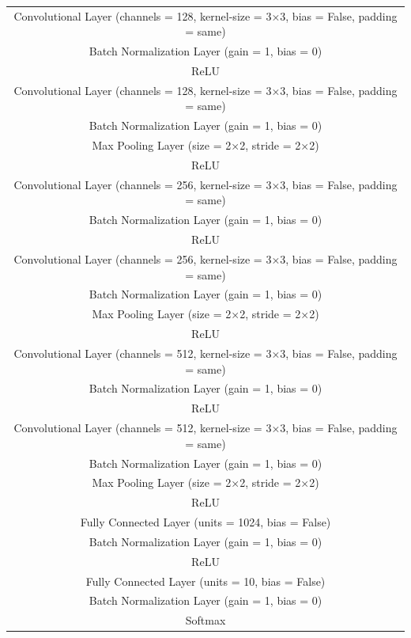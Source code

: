 \begin{table}[H]
\begin{center}
\begin{tabular}{  c  }
\hline
   Convolutional Layer (channels = 128, kernel-size = 3×3, bias = False, padding = same) \\ 
   Batch Normalization Layer (gain = 1, bias = 0) \\ 
   ReLU \\ \hline

   Convolutional Layer (channels = 128, kernel-size = 3×3, bias = False, padding = same)  \\ 
   Batch Normalization Layer (gain = 1, bias = 0)  \\
   Max Pooling Layer (size = 2×2, stride = 2×2)  \\
   ReLU \\ \hline

   Convolutional Layer (channels = 256, kernel-size = 3×3, bias = False, padding = same)\\ 
   Batch Normalization Layer (gain = 1, bias = 0) \\ 
   ReLU \\ \hline

   Convolutional Layer (channels = 256, kernel-size = 3×3, bias = False, padding = same) \\ 
   Batch Normalization Layer (gain = 1, bias = 0) \\
   Max Pooling Layer (size = 2×2, stride = 2×2)  \\
   ReLU  \\ \hline

   Convolutional Layer (channels = 512, kernel-size = 3×3, bias = False, padding = same) \\ 
   Batch Normalization Layer (gain = 1, bias = 0) \\ 
   ReLU \\ \hline
   
   Convolutional Layer (channels = 512, kernel-size = 3×3, bias = False, padding = same) \\ 
   Batch Normalization Layer (gain = 1, bias = 0) \\
   Max Pooling Layer (size = 2×2, stride = 2×2)  \\
   ReLU \\ \hline

   Fully Connected Layer (units = 1024, bias = False) \\
   Batch Normalization Layer (gain = 1, bias = 0)  \\ 
   ReLU  \\ \hline

   Fully Connected Layer (units = 10, bias = False)  \\
   Batch Normalization Layer (gain = 1, bias = 0) \\ 
   Softmax   \\\hline

\end{tabular}
\end{center}
\end{table}

